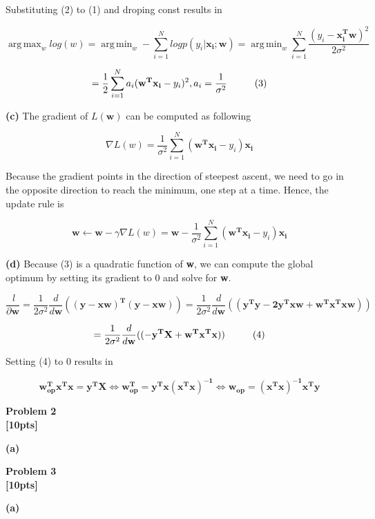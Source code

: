 \documentclass[12pt,article]{article}
\DeclareMathOperator*{\argmax}{arg\,max}
\DeclareMathOperator*{\argmin}{arg\,min}
\newcommand\tab[1][1cm]{\hspace*{#1}}
\newenvironment{problem}[2][Problem]
    { \begin{mdframed}[backgroundcolor=gray!20] \textbf{#1 #2} \\}
    {  \end{mdframed}}
\begin{document}
Substituting (2) to (1) and droping const results in

$$\argmax_{w} log(w) 
= \argmin_{w} -\sum_{i=1}^{N} log p(y_i | \mathbf{x_i; w})
= \argmin_{w} \sum_{i=1}^{N} \frac{(y_i - \mathbf{x_i^T w})^2}{2\sigma^2}
$$

$$
= \frac{1}{2} \sum_{i=1}^{N} a_i (\mathbf{w^T x_i} - y_i)^2, a_i = \frac{1}{\sigma^2} \tab[1cm] (3)
$$ 

\textbf{(c)}
The gradient of $L(\mathbf{w})$ can be computed as following

$$
\nabla L(w) = \frac{1}{\sigma^2} \sum_{i=1}^{N} (\mathbf{w^T x_i} - y_i) \mathbf{x_i}
$$

Because the gradient points in the direction of steepest ascent, we need to 
go in the opposite direction to reach the minimum, one step at a time. Hence, 
the update rule is 

$$
\mathbf{w \leftarrow w} - \gamma \nabla L(w) = \mathbf{w} - \frac{1}{\sigma^2} \sum_{i=1}^{N} (\mathbf{w^T x_i} - y_i) \mathbf{x_i}
$$

\textbf{(d)}
Because (3) is a quadratic function of \textbf{w}, we can compute the global 
optimum by setting its gradient to 0 and solve for \textbf{w}.

$$
\frac{\ l}{\partial \mathbf{w}} 
= \frac{1}{2\sigma^2} \frac{d}{d\mathbf{w}} (\mathbf{(y - xw)^T (y - xw)})
= \frac{1}{2\sigma^2} \frac{d}{d\mathbf{w}} (\mathbf{(y^Ty -2y^Txw + w^Tx^Txw)})
$$

$$
= \frac{1}{2\sigma^2} \frac{d}{d\mathbf{w}} (\mathbf{(-y^TX + w^Tx^Tx)}) \tab[1cm] (4)
$$

Setting (4) to 0 results in

$$
\mathbf{w_{op}^Tx^Tx = y^TX}
\Leftrightarrow
\mathbf{w_{op}^T = y^Tx(x^Tx)^{-1}}
\Leftrightarrow
\mathbf{w_{op} = (x^Tx)^{-1}x^Ty}
$$

\newpage
\begin{problem}{2}
\textbf{[10pts]}
\end{problem}

\textbf{(a)}

\newpage
\begin{problem}{3}
\textbf{[10pts]}
\end{problem}

\textbf{(a)}
\end{document}
